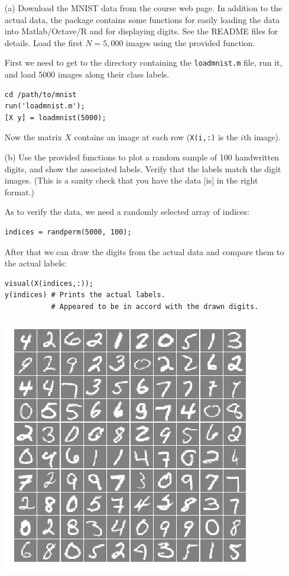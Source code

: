 \documentclass[10pt]{article}
\begin{document}
\begin{itemize}
\item[(a)] Download the MNIST data from the course web page. In addition to the actual data, the package contains some functions for easily loading the data into Matlab/Octave/R and for displaying digits. See the README files for details. Load the first $N=5,000$ images using the provided function.

\color{black}
First we need to get to the directory containing the \texttt{loadmnist.m} file, run it, and load 5000 images along their class labels.
\begin{verbatim}
cd /path/to/mnist
run('loadmnist.m');
[X y] = loadmnist(5000);
\end{verbatim}
Now the matrix $X$ contains an image at each row (\texttt{X(i,:)} is the $i$th image).

\color{blue}
\item[(b)] Use the provided functions to plot a random sample of 100 handwritten digits, and show the associated labels. Verify that the labels match the digit images. (This is a sanity check that you have the data [is] in the right format.)

\color{black} As to verify the data, we need a randomly selected array of indices:
\begin{verbatim}
indices = randperm(5000, 100);
\end{verbatim}
After that we can draw the digits from the actual data and compare them to the actual labels:
\begin{verbatim}
visual(X(indices,:));
y(indices) # Prints the actual labels. 
           # Appeared to be in accord with the drawn digits.
\end{verbatim}

\includegraphics[width=\textwidth]{mnist_sample.png}


\end{itemize}
\end{document}
